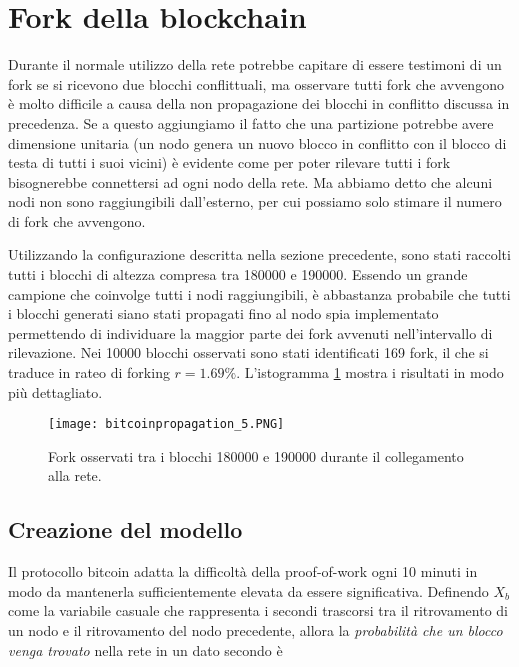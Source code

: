 \section{Fork della blockchain}\label{fork-della-blockchain}

Durante il normale utilizzo della rete potrebbe capitare di essere testimoni di un fork se si ricevono due blocchi conflittuali, ma osservare tutti fork che avvengono è molto difficile a causa della non propagazione dei blocchi in conflitto discussa in precedenza. Se a questo aggiungiamo il fatto che una partizione potrebbe avere dimensione unitaria (un nodo genera un nuovo blocco in conflitto con il blocco di testa di tutti i suoi vicini) è evidente come per poter rilevare tutti i fork bisognerebbe connettersi ad ogni nodo della rete. Ma abbiamo detto che alcuni nodi non sono raggiungibili dall'esterno, per cui possiamo solo stimare il numero di fork che avvengono.

Utilizzando la configurazione descritta nella sezione precedente, sono stati raccolti tutti i blocchi di altezza compresa tra 180000 e 190000. Essendo un grande campione che coinvolge tutti i nodi raggiungibili, è abbastanza probabile che tutti i blocchi generati siano stati propagati fino al nodo spia implementato permettendo di individuare la maggior parte dei fork avvenuti nell'intervallo di rilevazione. Nei 10000 blocchi osservati sono stati identificati 169 fork, il che si traduce in rateo di forking $r = 1.69\%$. L'istogramma \ref{bitcoinpropagation_5} mostra i risultati in modo più dettagliato.

\begin{figure}[htbp]
\centering
\texttt{[image: bitcoinpropagation\_5.PNG]}
\caption{Fork osservati tra i blocchi 180000 e 190000 durante il collegamento alla rete.\label{bitcoinpropagation_5}}
\end{figure}

\subsection{Creazione del modello}\label{creazione-del-modello}

Il protocollo bitcoin adatta la difficoltà della proof-of-work ogni 10 minuti in modo da mantenerla sufficientemente elevata da essere significativa. Definendo $X_b$ come la variabile casuale che rappresenta i secondi trascorsi tra il ritrovamento di un nodo e il ritrovamento del nodo precedente, allora la \emph{probabilità che un blocco venga trovato} nella rete in un dato secondo è

